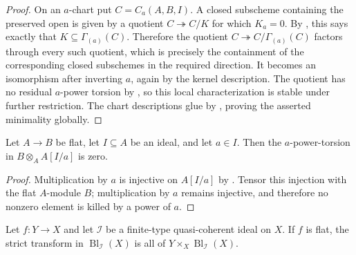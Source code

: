 \begin{proof}
  \leanok
  On an $a$-chart put $C=C_a(A,B,I)$.  A closed subscheme containing the
  preserved open is given by a quotient $C\twoheadrightarrow C/K$ for which
  $K_a=0$.  By
  , this says exactly
  that $K\subseteq\Gamma_{(a)}(C)$.  Therefore the quotient
  $C\twoheadrightarrow C/\Gamma_{(a)}(C)$ factors through every such
  quotient, which is precisely the containment of the corresponding closed
  subschemes in the required direction.  It becomes an isomorphism after
  inverting $a$, again by the kernel description.  The quotient has no
  residual $a$-power torsion by
  , so this local
  characterization is stable under further restriction.  The chart
  descriptions glue by
  , proving the
  asserted minimality globally.
\end{proof}

\begin{lemma}
  \label{lemma:nagata-flat-strict-transform-no-torsion}

  Let $A\to B$ be flat, let $I\subseteq A$ be an ideal, and let $a\in I$.
  Then the $a$-power-torsion in
  $B\otimes_AA[I/a]$ is zero.
\end{lemma}

\begin{proof}
  Multiplication by $a$ is injective on $A[I/a]$ by
  .  Tensor this injection with the
  flat $A$-module $B$; multiplication by $a$ remains injective, and therefore
  no nonzero element is killed by a power of $a$.
\end{proof}

\begin{corollary}
  \label{cor:nagata-flat-strict-transform-base-change}

  Let $f\colon Y\to X$ and let $\mathcal I$ be a finite-type quasi-coherent
  ideal on $X$.  If $f$ is flat, the strict transform in
  $\operatorname{Bl}_{\mathcal I}(X)$ is all of
  $Y\times_X\operatorname{Bl}_{\mathcal I}(X)$.
\end{corollary}

